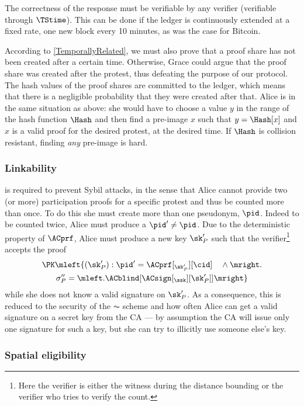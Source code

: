The correctness of the response must be verifiable by any verifier (verifiable 
through \(\TStime\)).
This can be done if the ledger is continuously extended at a fixed rate, \eg 
one new block every 10 minutes, as was the case for Bitcoin.

According to \cref{TemporallyRelated}, we must also prove that a proof share has not been created after a certain time.
Otherwise, Grace could argue that the proof share was created after the protest, thus defeating the purpose of our protocol.
The hash values of the proof shares are committed to the ledger, which means 
that there is a negligible probability that they were created after that.
Alice is in the same situation as above:
she would have to choose a value \(y\) in the range of the hash function 
\(\Hash\) and then find a pre-image \(x\) such that \(y = \Hash[x]\) and \(x\) 
is a valid proof for the desired protest, at the desired time.
If \(\Hash\) is collision resistant, finding \emph{any} pre-image is hard.

\subsubsection{Linkability}%
\label{analysis-linkability}

 is required to prevent Sybil attacks, in the sense
that Alice cannot provide two (or more) participation proofs for a
specific protest and thus be counted more than once.
To do this she must create more than one pseudonym, \(\pid\).
Indeed to be counted twice, Alice must produce a \(\pid'\neq \pid\).
Due to the deterministic property of \(\ACprf\), Alice must produce a new key 
\(\sk_P'\) such that the verifier\footnote{%
  Here the verifier is either the witness during the distance bounding or the 
  verifier who tries to verify the count.
} accepts the proof
\begin{multline*}
\PK\mleft\{ (\sk_P') : \pid' = \ACprf[_{\sk_P'}][\cid] \quad \land \mright. \\
    \sigma_P'' = \mleft. \ACblind[\ACsign[_{\ssk}][\sk_P']] \mright\}
\end{multline*}
while she does not know a valid signature on \(\sk_P'\).
As a consequence, this is reduced to the security of the \(\AC\) scheme and how 
often Alice can get a valid signature on a secret key from the \ac{CA} --- by 
assumption the \ac{CA} will issue only one signature for such a key, but she 
can try to illicitly use someone else's key.

\subsubsection{Spatial eligibility}%
\label{analysis-spatial}

